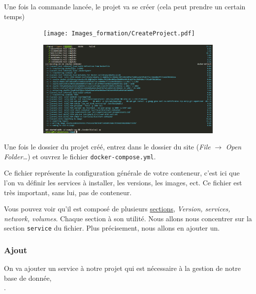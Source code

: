         Une fois la commande lancée, le projet va se créer (cela peut prendre un certain temps)

        \begin{figure}[h]
            \centering
            \begin{subfigure}{0.3\textwidth}
                \texttt{[image: Images\_formation/CreateProject.pdf]}
            \end{subfigure}
            \begin{subfigure}{0.3\textwidth}
                \includegraphics[width=\textwidth]{Images_formation/CreateProject2.pdf}
            \end{subfigure}
        \end{figure}

        Une fois le dossier du projet créé, entrez dans le dossier du site (\textit{File} $\rightarrow$ \textit{Open Folder\ldots}) et ouvrez le fichier \verb|docker-compose.yml|.

        Ce fichier représente la configuration générale de votre conteneur, c'est ici que l'on va définir les services à installer, les versions, les images, ect.
        Ce fichier est très important, sans lui, pas de conteneur.

        Vous pouvez voir qu'il est composé de plusieurs \href{https://docs.docker.com/compose/compose-file/}{sections}, \textit{Version, services, network, volumes}. Chaque section à son utilité. Nous allons nous concentrer sur la section \verb|service| du fichier. Plus précisement, nous allons en ajouter un.


    \subsubsection[Ajout PhpMyAdmin]{Ajout \phpmyadmin{}}

        On va ajouter un service à notre projet qui est nécessaire à la gestion de notre base de donnée,\\ \phpmyadmin{}.
        
